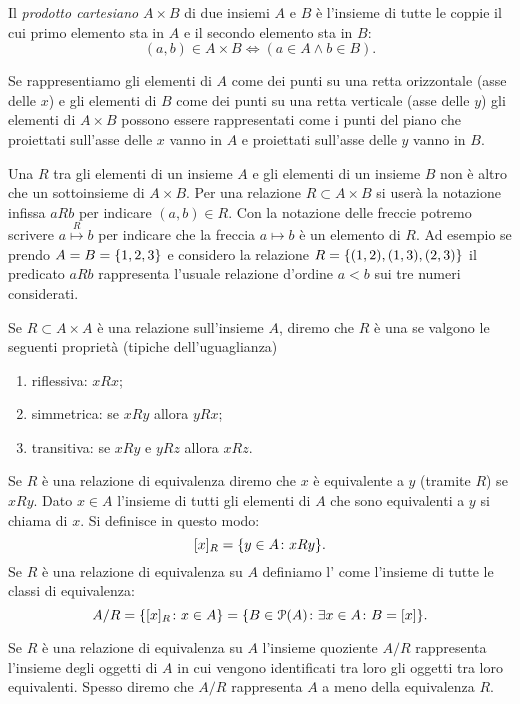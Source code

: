 Il \emph{prodotto cartesiano} $A\times B$ di due insiemi $A$ e $B$
è l'insieme di tutte le coppie
il cui primo elemento sta in $A$ e
il secondo elemento sta in $B$:
\[
  (a, b) \in A \times B \iff (a\in A \land b\in B).
\]

Se rappresentiamo gli elementi di $A$ come dei punti su una retta
orizzontale (asse delle $x$) e gli elementi di $B$ come dei punti
su una retta verticale (asse delle $y$) gli elementi di $A\times B$
possono essere rappresentati come i punti del piano che proiettati sull'asse
delle $x$ vanno in $A$ e proiettati sull'asse delle $y$ vanno in $B$.
  
Una  $R$ tra gli elementi di un insieme $A$ e gli elementi
di un insieme $B$ non è altro che un sottoinsieme di $A\times B$.
Per una relazione $R\subset A\times B$ si userà la notazione infissa
$aRb$ per indicare $(a,b)\in R$.
Con la notazione delle freccie potremo scrivere $a \stackrel R \mapsto b$
per indicare che la freccia $a\mapsto b$ è un elemento di $R$. 
Ad esempio se prendo $A=B={\left\{ 1,2,3 \right\}}$ e considero la relazione 
$R={\left\{ (1,2),(1,3),(2,3) \right\}}$
il predicato $aRb$ rappresenta l'usuale relazione d'ordine $a<b$ sui
tre numeri considerati.

\begin{definition}
\label{def:equivalenza}%
Se $R\subset A\times A$ è una relazione sull'insieme $A$, diremo che 
$R$ è una  se valgono le seguenti proprietà
(tipiche dell'uguaglianza)
\begin{enumerate}
  \item riflessiva: $x R x$;
  \item simmetrica: se $x R y$ allora $y R x$;
  \item transitiva: se $x R y$ e $yRz$ allora $x R z$.
\end{enumerate}
Se $R$ è una relazione di equivalenza diremo che $x$ è equivalente a $y$ 
(tramite $R$) se $xRy$.
Dato $x \in A$ l'insieme di tutti gli elementi di $A$ che sono equivalenti 
a $y$ si chiama  di $x$. 
Si definisce in questo modo:
\[
  [x]_R = {\left\{ y\in A \colon xRy \right\}}.  
\]
Se $R$ è una relazione di equivalenza su $A$ definiamo 
l'
come l'insieme di tutte le classi di equivalenza:
\[
 A/R 
 = {\left\{ [x]_R\colon x\in A \right\}} 
 = {\left\{ B\in \mathcal P(A)\colon \exists x\in A\colon B=[x] \right\}}.  
\]
\end{definition}

Se $R$ è una relazione di equivalenza su $A$ 
l'insieme quoziente $A/R$ rappresenta l'insieme 
degli oggetti di $A$ in cui vengono identificati tra loro gli oggetti tra loro 
equivalenti.
Spesso diremo che $A/R$ rappresenta $A$ a meno della equivalenza $R$.

